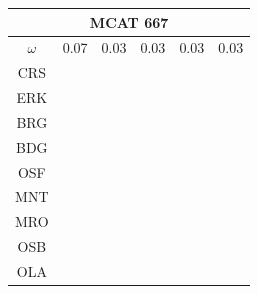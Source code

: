 \documentclass[12pt]{article}
\begin{document}
\begin{landscape}
\begin{figure}
\begin{minipage}[c]{0.3\textwidth}
\hspace*{-2.5cm}
\begin{tabular}{|c|c|c|c|c|c|}%
         \hline \multicolumn{6}{|c|}{MCAT 667} \\ \hline
         $\omega$&0.07&0.03&0.03&0.03&0.03\\ \hline %
        CRS&\cellcolor[HTML]{E41A1C}&\cellcolor[HTML]{E41A1C}&\cellcolor[HTML]{E41A1C}&\cellcolor[HTML]{E41A1C}&\cellcolor[HTML]{E41A1C}\\ \hline %
        ERK&\cellcolor[HTML]{377EB8}&\cellcolor[HTML]{E41A1C}&\cellcolor[HTML]{E41A1C}&\cellcolor[HTML]{377EB8}&\cellcolor[HTML]{E41A1C}\\ \hline %
        BRG&\cellcolor[HTML]{4DAF4A}&\cellcolor[HTML]{E41A1C}&\cellcolor[HTML]{E41A1C}&\cellcolor[HTML]{377EB8}&\cellcolor[HTML]{E41A1C}\\ \hline %
        BDG&\cellcolor[HTML]{4DAF4A}&\cellcolor[HTML]{377EB8}&\cellcolor[HTML]{377EB8}&\cellcolor[HTML]{377EB8}&\cellcolor[HTML]{377EB8}\\ \hline %
        OSF&\cellcolor[HTML]{4DAF4A}&\cellcolor[HTML]{377EB8}&\cellcolor[HTML]{377EB8}&\cellcolor[HTML]{4DAF4A}&\cellcolor[HTML]{4DAF4A}\\ \hline %
        MNT&\cellcolor[HTML]{984EA3}&\cellcolor[HTML]{4DAF4A}&\cellcolor[HTML]{377EB8}&\cellcolor[HTML]{4DAF4A}&\cellcolor[HTML]{4DAF4A}\\ \hline %
        MRO&\cellcolor[HTML]{984EA3}&\cellcolor[HTML]{4DAF4A}&\cellcolor[HTML]{4DAF4A}&\cellcolor[HTML]{984EA3}&\cellcolor[HTML]{984EA3}\\ \hline %
        OSB&\cellcolor[HTML]{FF7F00}&\cellcolor[HTML]{984EA3}&\cellcolor[HTML]{984EA3}&\cellcolor[HTML]{FF7F00}&\cellcolor[HTML]{FF7F00}\\ \hline %
        OLA&\cellcolor[HTML]{FF7F00}&\cellcolor[HTML]{984EA3}&\cellcolor[HTML]{984EA3}&\cellcolor[HTML]{FF7F00}&\cellcolor[HTML]{FF7F00}\\ \hline %

\end{tabular}
\end{minipage}
\end{figure}
\end{landscape}
\end{document}
